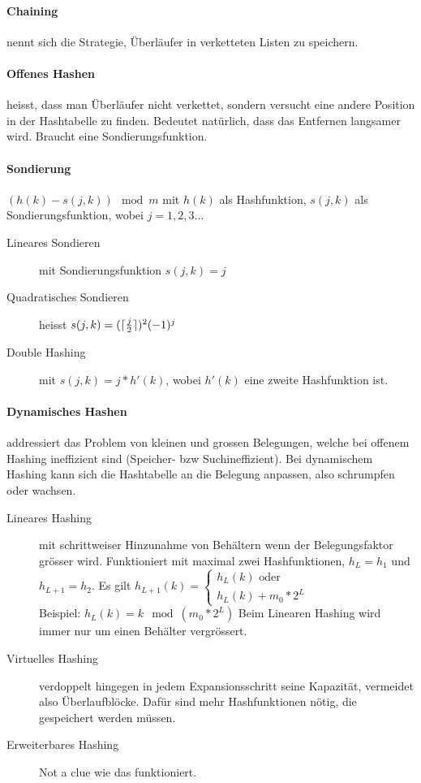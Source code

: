 \documentclass[a4paper, 9pt, DIV=20]{scrartcl}
\DeclarePairedDelimiter{\ceil}{\lceil}{\rceil}
\begin{document}
\paragraph{Chaining} nennt sich die Strategie, Überläufer in verketteten Listen zu speichern.

\paragraph{Offenes Hashen} heisst, dass man Überläufer nicht verkettet, sondern versucht eine andere Position in der Hashtabelle zu finden. Bedeutet natürlich, dass das Entfernen langsamer wird. Braucht eine Sondierungsfunktion.

\paragraph{Sondierung} $(h(k)-s(j,k))\mod{m}$ mit $h(k)$ als Hashfunktion, $s(j,k)$ als Sondierungsfunktion, wobei $j=1,2,3\dots$

\begin{description}
\item[Lineares Sondieren] mit Sondierungsfunktion $s(j,k)=j$
\item[Quadratisches Sondieren] heisst $s(j,k)=(\ceil{\frac{j}{2}})^{2}(-1)^{j}$
\item[Double Hashing] mit $s(j,k)=j*h'(k)$, wobei $h'(k)$ eine zweite Hashfunktion ist.
\end{description}

\paragraph{Dynamisches Hashen} addressiert das Problem von kleinen und grossen Belegungen, welche bei offenem Hashing ineffizient sind (Speicher- bzw Suchineffizient). Bei dynamischem Hashing kann sich die Hashtabelle an die Belegung anpassen, also schrumpfen oder wachsen.
\begin{description}
\item[Lineares Hashing] mit schrittweiser Hinzunahme von Behältern wenn der Belegungsfaktor grösser wird. Funktioniert mit maximal zwei Hashfunktionen, $h_{L}=h_{1}$ und $h_{L+1}=h_{2}$. Es gilt $h_{L+1}(k) = \begin{cases}
h_{L}(k) \text{ oder}\\ h_{L}(k)+m_{0}*2^{L} \end{cases}$ \\ Beispiel: $h_{L}(k)=k\mod{(m_{0}*2^{L})}$ Beim Linearen Hashing wird immer nur um einen Behälter vergrössert.
\item[Virtuelles Hashing] verdoppelt hingegen in jedem Expansionsschritt seine Kapazität, vermeidet also Überlaufblöcke. Dafür sind mehr Hashfunktionen nötig, die gespeichert werden müssen. 
\item[Erweiterbares Hashing] Not a clue wie das funktioniert.
\end{description}
\end{document}
